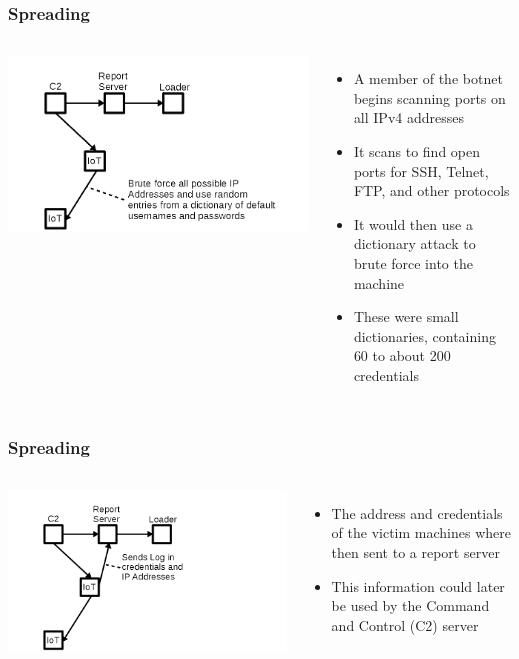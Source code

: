 \documentclass{beamer}
\begin{document}
\begin{frame}
	\frametitle{Spreading}
	\begin{columns}
			\includegraphics[width=\textwidth]{fig1.png}
			\begin{itemize}
				\item<+-> A member of the botnet begins scanning ports on all IPv4 addresses
				\item<+-> It scans to find open ports for SSH, Telnet, FTP, and other protocols
				\item<+-> It would then use a dictionary attack to brute force into the machine
				\item<+-> These were small dictionaries, containing 60 to about 200 credentials
			\end{itemize}
	\end{columns}
\end{frame}

\begin{frame}
	\frametitle{Spreading}
	\begin{columns}
		\column{0.5\linewidth}
			\includegraphics[width=\textwidth]{fig2.png}
		\column{0.5\linewidth}
			\begin{itemize}
				\item<+-> The address and credentials of the victim machines where then sent to a report server
				\item<+-> This information could later be used by the Command and Control (C2) server
			\end{itemize}
	\end{columns}
\end{frame}
\end{document}
